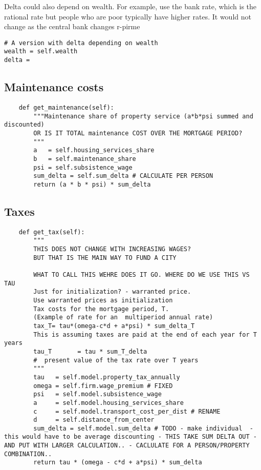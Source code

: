 Delta could also depend on wealth. For example,  use the bank rate, which is the rational rate but people who are poor typically have higher rates.  It would not change as the central bank changes r-pirme

\begin{lstlisting}
# A version with delta depending on wealth
wealth = self.wealth
delta =
\end{lstlisting}
 
\subsection{Maintenance costs}
\begin{lstlisting}
    def get_maintenance(self):
        """Maintenance share of property service (a*b*psi summed and discounted)
        OR IS IT TOTAL maintenance COST OVER THE MORTGAGE PERIOD?
        """
        a   = self.housing_services_share
        b   = self.maintenance_share
        psi = self.subsistence_wage
        sum_delta = self.sum_delta # CALCULATE PER PERSON
        return (a * b * psi) * sum_delta
\end{lstlisting}

\subsection{Taxes}
\begin{lstlisting}
    def get_tax(self):
        """ 
        THIS DOES NOT CHANGE WITH INCREASING WAGES?
        BUT THAT IS THE MAIN WAY TO FUND A CITY

        WHAT TO CALL THIS WEHRE DOES IT GO. WHERE DO WE USE THIS VS TAU
        Just for initialization? - warranted price. 
        Use warranted prices as initialization
        Tax costs for the mortgage period, T. 
        (Example of rate for an  multiperiod annual rate)
        tax_T= tau*(omega-c*d + a*psi) * sum_delta_T
        This is assuming taxes are paid at the end of each year for T years
        tau_T       = tau * sum_T_delta 
        #  present value of the tax rate over T years        
        """
        tau   = self.model.property_tax_annually
        omega = self.firm.wage_premium # FIXED
        psi   = self.model.subsistence_wage
        a     = self.model.housing_services_share
        c     = self.model.transport_cost_per_dist # RENAME
        d     = self.distance_from_center
        sum_delta = self.model.sum_delta # TODO - make individual  - this would have to be average discounting - THIS TAKE SUM DELTA OUT - AND PUT WITH LARGER CALCULATION.. - CACLULATE FOR A PERSON/PROPERTY COMBINATION..
        return tau * (omega - c*d + a*psi) * sum_delta
\end{lstlisting}


